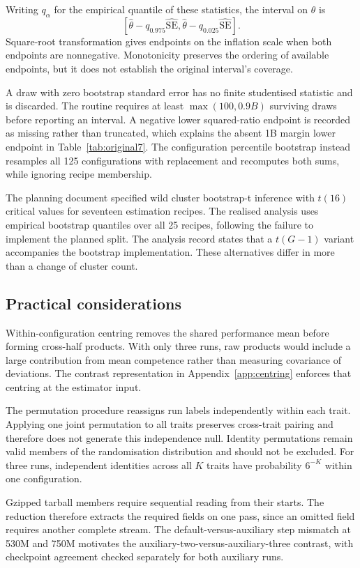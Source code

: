 Writing $q_\alpha$ for the empirical quantile of these statistics, the interval on $\theta$ is
\[
\left[\widehat\theta-q_{0.975}\widehat{\mathrm{SE}},
\widehat\theta-q_{0.025}\widehat{\mathrm{SE}}\right].
\]
Square-root transformation gives endpoints on the inflation scale when both endpoints are nonnegative. Monotonicity preserves the ordering of available endpoints, but it does not establish the original interval's coverage.

A draw with zero bootstrap standard error has no finite studentised statistic and is discarded. The routine requires at least $\max(100,0.9B)$ surviving draws before reporting an interval. A negative lower squared-ratio endpoint is recorded as missing rather than truncated, which explains the absent 1B margin lower endpoint in Table~\ref{tab:original7}. The configuration percentile bootstrap instead resamples all 125 configurations with replacement and recomputes both sums, while ignoring recipe membership.

The planning document specified wild cluster bootstrap-t inference with $t(16)$ critical values for seventeen estimation recipes. The realised analysis uses empirical bootstrap quantiles over all 25 recipes, following the failure to implement the planned split. The analysis record states that a $t(G-1)$ variant accompanies the bootstrap implementation. These alternatives differ in more than a change of cluster count.

\subsection{Practical considerations}
Within-configuration centring removes the shared performance mean before forming cross-half products. With only three runs, raw products would include a large contribution from mean competence rather than measuring covariance of deviations. The contrast representation in Appendix~\ref{app:centring} enforces that centring at the estimator input.

The permutation procedure reassigns run labels independently within each trait. Applying one joint permutation to all traits preserves cross-trait pairing and therefore does not generate this independence null. Identity permutations remain valid members of the randomisation distribution and should not be excluded. For three runs, independent identities across all $K$ traits have probability $6^{-K}$ within one configuration.

Gzipped tarball members require sequential reading from their starts. The reduction therefore extracts the required fields on one pass, since an omitted field requires another complete stream. The default-versus-auxiliary step mismatch at 530M and 750M motivates the auxiliary-two-versus-auxiliary-three contrast, with checkpoint agreement checked separately for both auxiliary runs.

